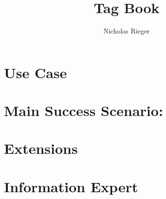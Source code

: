 \documentclass{article}
\title{Tag Book}
\author{Nicholas Rieger}
\begin{document}
\maketitle

\section*{Use Case}

\section*{Main Success Scenario:}

\section*{Extensions}

\section*{Information Expert}
\end{document}
